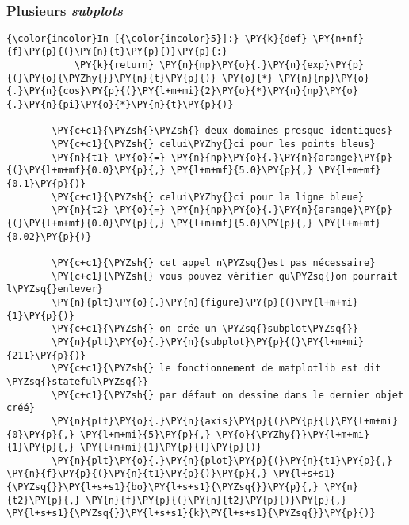     \begin{center}
    \end{center}
    { \hspace*{\fill} \\}
    
    \hypertarget{plusieurs-subplots}{%
\subsubsection{\texorpdfstring{Plusieurs
\emph{subplots}}{Plusieurs subplots}}\label{plusieurs-subplots}}

    \begin{Verbatim}[commandchars=\\\{\},frame=single,framerule=0.3mm,rulecolor=\color{cellframecolor}]
{\color{incolor}In [{\color{incolor}5}]:} \PY{k}{def} \PY{n+nf}{f}\PY{p}{(}\PY{n}{t}\PY{p}{)}\PY{p}{:}
            \PY{k}{return} \PY{n}{np}\PY{o}{.}\PY{n}{exp}\PY{p}{(}\PY{o}{\PYZhy{}}\PY{n}{t}\PY{p}{)} \PY{o}{*} \PY{n}{np}\PY{o}{.}\PY{n}{cos}\PY{p}{(}\PY{l+m+mi}{2}\PY{o}{*}\PY{n}{np}\PY{o}{.}\PY{n}{pi}\PY{o}{*}\PY{n}{t}\PY{p}{)}
        
        \PY{c+c1}{\PYZsh{}\PYZsh{} deux domaines presque identiques}
        \PY{c+c1}{\PYZsh{} celui\PYZhy{}ci pour les points bleus}
        \PY{n}{t1} \PY{o}{=} \PY{n}{np}\PY{o}{.}\PY{n}{arange}\PY{p}{(}\PY{l+m+mf}{0.0}\PY{p}{,} \PY{l+m+mf}{5.0}\PY{p}{,} \PY{l+m+mf}{0.1}\PY{p}{)}
        \PY{c+c1}{\PYZsh{} celui\PYZhy{}ci pour la ligne bleue}
        \PY{n}{t2} \PY{o}{=} \PY{n}{np}\PY{o}{.}\PY{n}{arange}\PY{p}{(}\PY{l+m+mf}{0.0}\PY{p}{,} \PY{l+m+mf}{5.0}\PY{p}{,} \PY{l+m+mf}{0.02}\PY{p}{)}
        
        \PY{c+c1}{\PYZsh{} cet appel n\PYZsq{}est pas nécessaire}
        \PY{c+c1}{\PYZsh{} vous pouvez vérifier qu\PYZsq{}on pourrait l\PYZsq{}enlever}
        \PY{n}{plt}\PY{o}{.}\PY{n}{figure}\PY{p}{(}\PY{l+m+mi}{1}\PY{p}{)}
        \PY{c+c1}{\PYZsh{} on crée un \PYZsq{}subplot\PYZsq{}}
        \PY{n}{plt}\PY{o}{.}\PY{n}{subplot}\PY{p}{(}\PY{l+m+mi}{211}\PY{p}{)}
        \PY{c+c1}{\PYZsh{} le fonctionnement de matplotlib est dit \PYZsq{}stateful\PYZsq{}}
        \PY{c+c1}{\PYZsh{} par défaut on dessine dans le dernier objet créé}
        \PY{n}{plt}\PY{o}{.}\PY{n}{axis}\PY{p}{(}\PY{p}{[}\PY{l+m+mi}{0}\PY{p}{,} \PY{l+m+mi}{5}\PY{p}{,} \PY{o}{\PYZhy{}}\PY{l+m+mi}{1}\PY{p}{,} \PY{l+m+mi}{1}\PY{p}{]}\PY{p}{)}
        \PY{n}{plt}\PY{o}{.}\PY{n}{plot}\PY{p}{(}\PY{n}{t1}\PY{p}{,} \PY{n}{f}\PY{p}{(}\PY{n}{t1}\PY{p}{)}\PY{p}{,} \PY{l+s+s1}{\PYZsq{}}\PY{l+s+s1}{bo}\PY{l+s+s1}{\PYZsq{}}\PY{p}{,} \PY{n}{t2}\PY{p}{,} \PY{n}{f}\PY{p}{(}\PY{n}{t2}\PY{p}{)}\PY{p}{,} \PY{l+s+s1}{\PYZsq{}}\PY{l+s+s1}{k}\PY{l+s+s1}{\PYZsq{}}\PY{p}{)}
        

\end{Verbatim}
